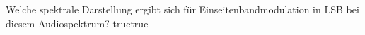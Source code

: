     {Welche spektrale Darstellung ergibt sich für Einseitenbandmodulation in LSB bei diesem Audiospektrum?}
    {}
    {}
    {}
    {}
    {true}{true}